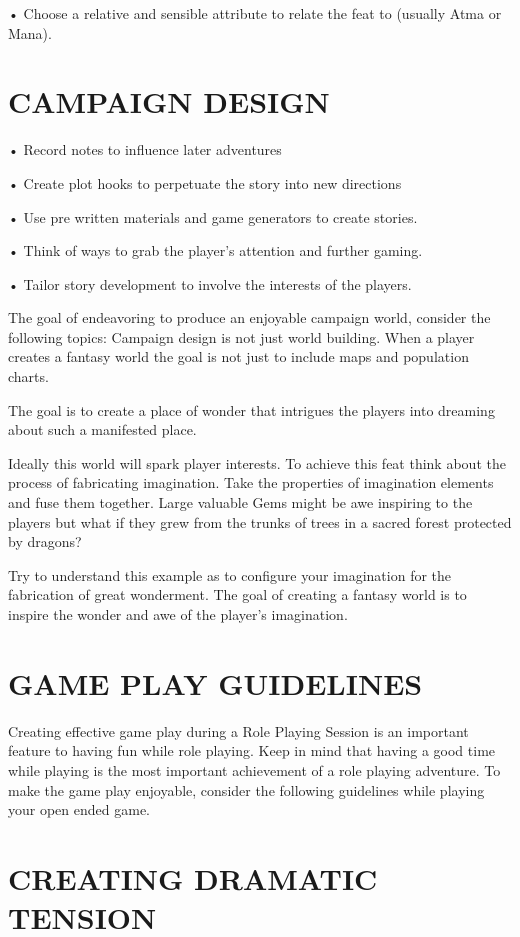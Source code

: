 \documentclass{article}
\begin{document}
• Choose a relative and sensible attribute to relate the feat to (usually Atma or Mana).

\section{CAMPAIGN DESIGN}

• Record notes to influence later adventures

• Create plot hooks to perpetuate the story into new directions

• Use pre written materials and game generators to create stories.

• Think of ways to grab the player’s attention and further gaming.

• Tailor story development to involve the interests of the players.

	The goal of endeavoring to produce an enjoyable campaign world, consider the following topics:
Campaign design is not just world building. When a player creates a fantasy world the goal is not
just to include maps and population charts.

The goal is to create a place of wonder that intrigues the players into dreaming about such a
manifested place.

	Ideally this world will spark player interests. To achieve this feat think about the process of
fabricating imagination. Take the properties of imagination elements and fuse them together.
Large valuable Gems might be awe inspiring to the players but what if they grew from the trunks
of trees in a sacred forest protected by dragons?

	Try to understand this example as to configure your imagination for the fabrication of great
wonderment. The goal of creating a fantasy world is to inspire the wonder and awe of the
player’s imagination.

\section{GAME PLAY GUIDELINES}
	
    Creating effective game play during a Role Playing Session is an important feature to having fun
while role playing. Keep in mind that having a good time while playing is the most important
achievement of a role playing adventure. To make the game play enjoyable, consider the
following guidelines while playing your open ended game.

\section{CREATING DRAMATIC TENSION}
\end{document}
